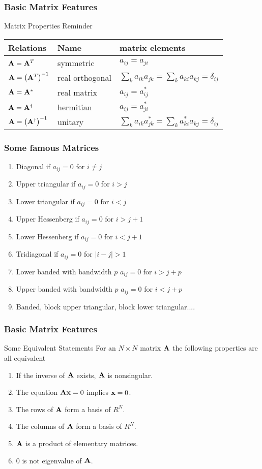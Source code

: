 \documentclass[compress]{beamer}
\begin{document}
\frame
{
  \frametitle{Basic Matrix Features}
  \begin{block}{Matrix Properties Reminder}
\begin{center}
\begin{tabular}{|l|l|l|}\hline
Relations               & Name       & matrix elements\\ \hline
$ {\bf A} = {\bf A}^{T}$ & symmetric & $a_{ij} = a_{ji} $ \\
$ {\bf A} = \left ({\bf A}^{T} \right )^{-1} $ & real orthogonal&
                   $\sum_k a_{ik} a_{jk} = \sum_k a_{ki} a_{kj} = \delta_{ij}$ \\
$ {\bf A} = {\bf A}^{*}  $ & real matrix& $a_{ij} = a_{ij}^{*}$\\
$ {\bf A} = {\bf A}^{\dagger}  $ &  hermitian& $a_{ij} = a_{ji}^{*}$\\
$ {\bf A} = \left ({\bf A}^{\dagger} \right )^{-1} $ & unitary&
             $\sum_k a_{ik} a_{jk}^{*} = \sum_k a_{ki}^{*} a_{kj}
                                                  = \delta_{ij}$ \\ \hline
\end{tabular}
\end{center}
  \end{block}
}

\frame
{
  \frametitle{Some famous Matrices}
\begin{enumerate}
\item Diagonal if $a_{ij}=0$ for $i\ne j$
\item Upper triangular if $a_{ij}=0$ for $i >j$
\item Lower triangular if $a_{ij}=0$ for $i <j$
\item Upper Hessenberg if $a_{ij}=0$ for $i >j+1$
\item Lower Hessenberg if $a_{ij}=0$ for $i <j+1$
\item Tridiagonal if $a_{ij}=0$ for $|i -j|>1$
\item Lower banded with bandwidth $p$ $a_{ij}=0$ for $i > j+p$
\item Upper banded with bandwidth $p$ $a_{ij}=0$ for $i < j+p$
\item Banded, block upper triangular, block lower triangular....
\end{enumerate}
}

\frame
{
  \frametitle{Basic Matrix Features}
  \begin{block}{Some Equivalent Statements}
For an $N\times N$ matrix  ${\bf A}$ the following properties are all equivalent
\begin{enumerate}
\item If the inverse of   ${\bf A}$ exists, ${\bf A}$ is nonsingular.
\item The equation ${\bf Ax}=0$ implies ${\bf x}=0$.
\item The rows of ${\bf A}$ form a basis of $R^N$.
\item  The columns of ${\bf A}$ form a basis of $R^N$.
\item ${\bf A}$ is a product of elementary matrices.
\item $0$ is not eigenvalue of ${\bf A}$.
\end{enumerate}
  \end{block}
}
\end{document}
